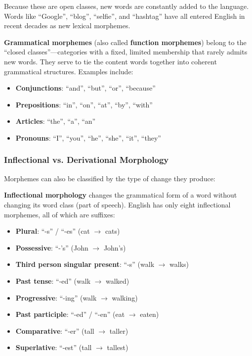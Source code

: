 \documentclass[11pt,a4paper]{article}
\begin{document}
Because these are open classes, new words are constantly added to the language. Words like ``Google'', ``blog'', ``selfie'', and ``hashtag'' have all entered English in recent decades as new lexical morphemes.

\textbf{Grammatical morphemes} (also called \textbf{function morphemes}) belong to the ``closed classes''---categories with a fixed, limited membership that rarely admits new words. They serve to tie the content words together into coherent grammatical structures. Examples include:
\begin{itemize}
    \item \textbf{Conjunctions}: ``and'', ``but'', ``or'', ``because''
    \item \textbf{Prepositions}: ``in'', ``on'', ``at'', ``by'', ``with''
    \item \textbf{Articles}: ``the'', ``a'', ``an''
    \item \textbf{Pronouns}: ``I'', ``you'', ``he'', ``she'', ``it'', ``they''
\end{itemize}

\subsubsection{Inflectional vs. Derivational Morphology}

Morphemes can also be classified by the type of change they produce:

\textbf{Inflectional morphology} changes the grammatical form of a word without changing its word class (part of speech). English has only eight inflectional morphemes, all of which are suffixes:
\begin{itemize}
    \item \textbf{Plural}: ``-s'' / ``-es'' (cat $\to$ cats)
    \item \textbf{Possessive}: ``-'s'' (John $\to$ John's)
    \item \textbf{Third person singular present}: ``-s'' (walk $\to$ walks)
    \item \textbf{Past tense}: ``-ed'' (walk $\to$ walked)
    \item \textbf{Progressive}: ``-ing'' (walk $\to$ walking)
    \item \textbf{Past participle}: ``-ed'' / ``-en'' (eat $\to$ eaten)
    \item \textbf{Comparative}: ``-er'' (tall $\to$ taller)
    \item \textbf{Superlative}: ``-est'' (tall $\to$ tallest)
\end{itemize}
\end{document}
